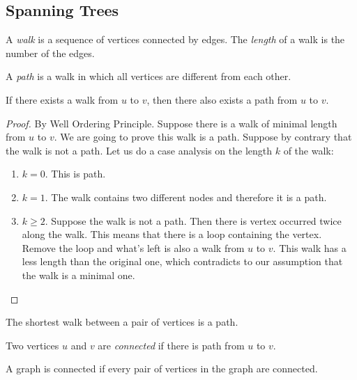 \documentclass[11pt]{article}
\begin{document}
\subsection{Spanning Trees}

\begin{definition}
A \emph{walk} is a sequence of vertices connected by edges. The \emph{length} of a walk is the number
of the edges.
\end{definition}

\begin{definition}
A \emph{path} is a walk in which all vertices are different from each other.
\end{definition}

\begin{lemma}
If there exists a walk from $u$ to $v$, then there also exists a path from $u$ to $v$.
\end{lemma}

\begin{proof}
By Well Ordering Principle. Suppose there is a walk of minimal length from $u$ to $v$. We are going
to prove this walk is a path. Suppose by contrary that the walk is not a path. Let us do a case
analysis on the length $k$ of the walk:
\begin{enumerate}
\item $k=0$. This is path.
\item $k=1$. The walk contains two different nodes and therefore it is a path.
\item $k \geq 2$. Suppose the walk is not a path. Then there is vertex occurred twice along the walk.
This means that there is a loop containing the vertex. Remove the loop and what's left is also a walk
from $u$ to $v$. This walk has a less length than the original one, which contradicts to our
assumption that the walk is a minimal one.
\end{enumerate}
\end{proof}

\begin{corollary}
The shortest walk between a pair of vertices is a path.
\end{corollary}

\begin{definition}
Two vertices $u$ and $v$ are \emph{connected} if there is path from $u$ to $v$.
\end{definition}

\begin{definition}
A graph is connected if every pair of vertices in the graph are connected.
\end{definition}
\end{document}

